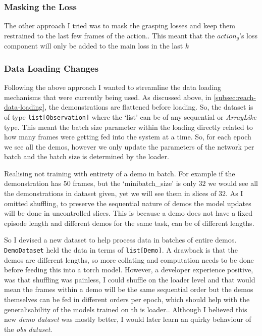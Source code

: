 \subsubsection{Masking the Loss}
The other approach I tried was to mask the grasping losses and keep them restrained to the last few frames of the action.. This meant that the $action_g$'s loss component will only be added to the main loss in the last $k$

\subsubsection{Data Loading Changes}
Following the above approach I wanted to streamline the data loading mechanisms that were currently being used. As discussed above, in \ref{subsec:reach-data-loading}, the demonstrations are flattened before loading. So, the dataset is of type \verb|list[Observation]| where the `list' can be of any sequential or \emph{ArrayLike} type. This meant the batch size parameter within the loading directly related to how many frames were getting fed into the system at a time. So, for each epoch we see all the demos, however we only update the parameters of the network per batch and the batch size is determined by the loader.

Realising not training with entirety of a demo in batch. For example if the demonstration has $50$ frames, but the `minibatch\_size' is only $32$ we would see all the demonstrations in dataset given, yet we will see them in slices of $32$. As I omitted shuffling, to preserve the sequential nature of demos the model updates will be done in uncontrolled slices. This is because a demo does not have a fixed episode length and different demos for the same task, can be of different lengths.

So I devised a new dataset to help process data in batches of entire demos. \verb|DemoDataset| held the data in terms of \verb|list[Demo]|. A drawback is that the demos are different lengths, so more collating and computation needs to be done before feeding this into a torch model. However, a developer experience positive, was that shuffling was painless, I could shuffle on the loader level and that would mean the frames within a demo will be the same sequential order but the demos themselves can be fed in different orders per epoch, which should help with the generalisability of the models trained on th is loader.. Although I believed this new \emph{demo dataset} was mostly better, I would later learn an quirky behaviour of the \emph{obs dataset}.



